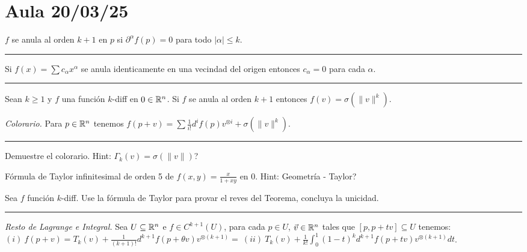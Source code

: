 \section*{Aula 20/03/25}

\begin{definition}
    \(f\) se anula al orden \(k+1\) en \(p\) si \(\partial^\alpha f(p)=0\) para todo \(|\alpha|\leq k\). 
\end{definition}

\E 

\hrule 
\begin{exercise}
    Si \(f(x)= \sum c_\alpha x^\alpha \) se anula identicamente en una vecindad del origen entonces \(c_\alpha = 0\) para cada \(\alpha\). 
\end{exercise}
\hrule 

\E

\begin{theorem}
    Sean \(k\geq 1\) y \(f\) una función \(k\)-diff en \(0\in \mathbb{R}^n\). Si \(f\) se anula al orden \(k+1 \) entonces \(f(v)=\sigma(\|v\|^k)\).
\end{theorem}
\begin{proposition}
    \emph{Colorario.} Para \(p\in\mathbb{R}^n\) tenemos \(f(p+v)= \sum \frac{1}{i!}d^if(p) v^{\otimes i}  + \sigma(\|v\|^k)\). 
\end{proposition}    

\E

\hrule 
\begin{exercise}
    Demuestre el colorario. Hint: \(\Gamma_k(v)= \sigma(\|v\|)\)? 
\end{exercise}
\begin{exercise}
    Fórmula de Taylor infinitesimal de orden 5 de \(f(x,y) = \frac{x}{1+xy}\) en \(0\). Hint: Geometría - Taylor?  
\end{exercise}
\begin{exercise}
    Sea \(f\) función \(k\)-diff. Use la fórmula de Taylor para provar el reves del Teorema, concluya la unicidad. 
\end{exercise}
\hrule 

\E 

\begin{proposition}
    \emph{Resto de Lagrange e Integral.} Sea \(U\subseteq \mathbb{R}^n \) e \(f\in C^{k+1}(U)\), para cada \(p\in U\), \(\vec{v}\in \mathbb{R}^n\) tales que \([p,p+tv]\subseteq U\) tenemos: \((i) \  f(p+v) = T_k(v) + \frac{1}{(k+1)!} d^{k+1}f(p+\theta v) v^{\otimes (k+1)} = \ (ii)\ T_k(v) + \frac{1}{k!} \displaystyle\int_0^1 (1-t)^kd^{k+1}f(p+tv) v^{\otimes (k+1)} dt \). 
\end{proposition}
